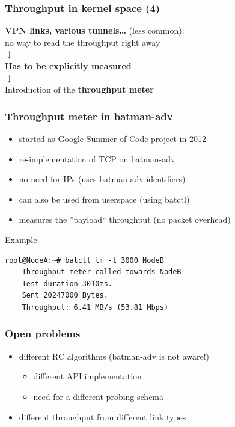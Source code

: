 \documentclass[slidestop]{beamer}
\begin{document}
\begin{frame}
	\frametitle{Throughput in kernel space (4)}
	\begin{center}
	\textbf{VPN links, various tunnels\dots} (less common):\\
	no way to read the throughput right away\\[0.1cm]
	$\downarrow$\\[0.5cm]
	\textbf{Has to be explicitly measured}\\[0.5cm]
	\pause
	$\downarrow$\\[0.5cm]
	Introduction of the \textbf{throughput meter}
	\end{center}
\end{frame}

\begin{frame}[c,fragile]
	\frametitle{Throughput meter in batman-adv}
	\begin{itemize}
		\item started as Google Summer of Code project in 2012
		\item re-implementation of TCP on batman-adv
		\item no need for IPs (uses batman-adv identifiers)
		\item can also be used from userspace (using batctl)
		\item measures the ''payload`` throughput (no packet overhead)
	\end{itemize}
	\addvspace{0.5cm}
	Example:\\
	\begin{lstlisting}[basicstyle=\scriptsize]
	root@NodeA:~# batctl tm -t 3000 NodeB
	Throughput meter called towards NodeB
	Test duration 3010ms.
	Sent 20247000 Bytes.
	Throughput: 6.41 MB/s (53.81 Mbps)
	\end{lstlisting}
\end{frame}

\begin{frame}[c]
	\frametitle{Open problems}
	\begin{itemize}
		\item different RC algorithms (batman-adv is not aware!)
		\begin{itemize}
			\item different API implementation
			\item need for a different probing schema
		\end{itemize}
		\item different throughput from different link types
	\end{itemize}
\end{frame}
\end{document}
